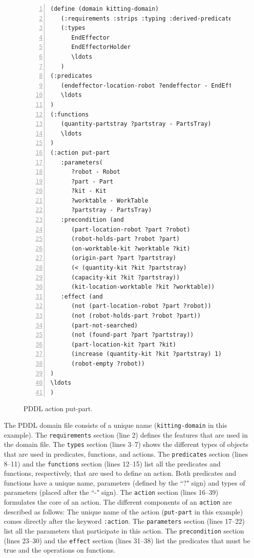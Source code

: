 \begin{figure}[t!h!]
\centering
\begin{minipage}{.5\paperwidth}
\begin{list}{}{\setlength{\leftmargin}{1em}}\item\small
\begin{Verbatim}[commandchars=\\\{\},fontsize=\scriptsize, numbers=left, numbersep=2pt]
(define (domain kitting-domain)
   (:requirements :strips :typing :derived-predicates :action-costs :fluents)
   (:types
      EndEffector
      EndEffectorHolder
      \ldots
   )
(:predicates
   (endeffector-location-robot ?endeffector - EndEffector ?robot - Robot)	
   \ldots
)
(:functions
   (quantity-partstray ?partstray - PartsTray)
   \ldots
)
(:action put-part
   :parameters(
      ?robot - Robot
      ?part - Part
      ?kit - Kit
      ?worktable - WorkTable
      ?partstray - PartsTray)
   :precondition (and
      (part-location-robot ?part ?robot)
      (robot-holds-part ?robot ?part)
      (on-worktable-kit ?worktable ?kit)
      (origin-part ?part ?partstray)
      (< (quantity-kit ?kit ?partstray)
      (capacity-kit ?kit ?partstray))
      (kit-location-worktable ?kit ?worktable))
   :effect (and
      (not (part-location-robot ?part ?robot))
      (not (robot-holds-part ?robot ?part))
      (part-not-searched)
      (not (found-part ?part ?partstray))
      (part-location-kit ?part ?kit)
      (increase (quantity-kit ?kit ?partstray) 1)
      (robot-empty ?robot))
)
\ldots
)
\end{Verbatim}
\end{list}
\end{minipage}
\caption{PDDL action put-part.}
\label{fig:put-part}
\end{figure}
The PDDL domain file consists of a unique name (\texttt{kitting-domain} 
in this example). The \texttt{requirements} section (line 2) 
defines the features that are used in the domain file. The \texttt{types} 
section (lines 3--7) shows the different types of objects that are used 
in predicates, functions, and actions. The \texttt{predicates} section 
(lines 8--11) and the \texttt{functions} section (lines 12--15) list all 
the predicates and functions, respectively, that are used to define an action. 
Both predicates and functions have a unique name, parameters (defined by the 
``?" sign) and types of parameters (placed after the ``-" sign). The \texttt{action} 
section (lines 16--39) formulates the core of an action. The different components 
of an \texttt{action} are described as follows: The unique name of the action 
(\texttt{put-part} in this example) comes directly after the keyword \texttt{:action}. 
The \texttt{parameters} section (lines 17--22) list all the parameters that 
participate in this action. The \texttt{precondition} section (lines 23--30) 
and the \texttt{effect} section (lines 31--38) list the predicates that must 
be true and the operations on functions.

